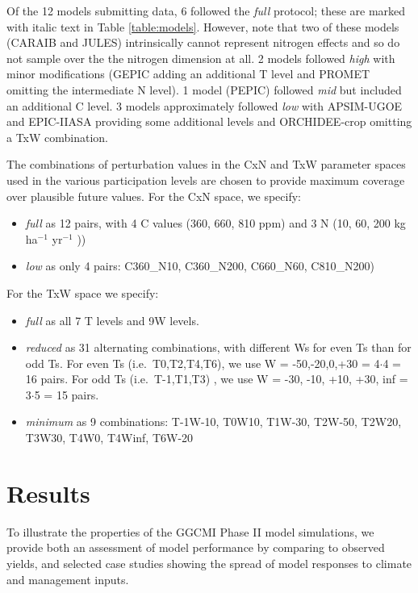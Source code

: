 \documentclass[gmd, manuscript]{copernicus} %
\begin{document}
Of the 12 models submitting data, 6 followed the \textit{full} protocol; these are marked with italic text in Table \ref{table:models}. However, note that two of these models (CARAIB and JULES) intrinsically cannot represent nitrogen effects and so do not sample over the the nitrogen dimension at all. 2 models followed \textit{high} with minor modifications (GEPIC adding an additional T level and PROMET omitting the intermediate N level). 1 model (PEPIC) followed \textit{mid} but included an additional C level. 3 models approximately followed \textit{low} with APSIM-UGOE and EPIC-IIASA providing some additional levels and ORCHIDEE-crop omitting a TxW combination.  

The combinations of perturbation values in the CxN and TxW parameter spaces used in the various participation levels are chosen to provide maximum coverage over plausible future values. For the CxN space, we specify:
\begin{itemize}
\item \textit{full} as 12 pairs, with 4 C values (360, 660, 810 ppm) and 3 N (10, 60, 200 kg ha$^{-1}$ yr$^{-1}$ ))
\item \textit{low} as only 4 pairs: C360\_N10, C360\_N200, C660\_N60, C810\_N200) 
\end{itemize}
    
For the TxW space we specify:
\begin{itemize}
\item \textit{full} as all 7 T levels and 9W levels.
\item \textit{reduced} as 31 alternating combinations, with different Ws for even Ts than for odd Ts. For even Ts (i.e.\ T0,T2,T4,T6), we use W = -50,-20,0,+30 = 4$\cdot$4 = 16 pairs. For odd Ts (i.e.\ T-1,T1,T3) , we use W = -30, -10, +10, +30, inf = 3$\cdot$5 = 15 pairs.
\item \textit{minimum} as 9 combinations: T-1W-10, T0W10, T1W-30, T2W-50, T2W20, T3W30, T4W0, T4Winf, T6W-20
\end{itemize}

\section{Results}
\label{S:4}

To illustrate the properties of the GGCMI Phase II model simulations, we provide both an assessment of model performance by comparing to observed yields, and selected case studies showing the spread of model responses to climate and management inputs.
\end{document}
